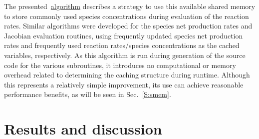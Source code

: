 \documentclass[final,twocolumn]{elsarticle}
\begin{document}
The presented~\hyperref[A:shared_mem_caching]{algorithm} describes a strategy to use this available shared memory to store commonly used species concentrations during evaluation of the reaction rates.
Similar algorithms were developed for the species net production rates and Jacobian evaluation routines, using frequently updated species net production rates and frequently used reaction rates\slash species concentrations as the cached variables, respectively.
As this algorithm is run during generation of the source code for the various subroutines, it introduces no computational or memory overhead related to determining the caching structure during runtime.
Although this represents a relatively simple improvement, its use can achieve reasonable performance benefits, as will be seen in Sec.~\ref{S:smem}.

\section{Results and discussion}
\ifmeasure
\addvspace{10pt}
\fi
\end{document}
